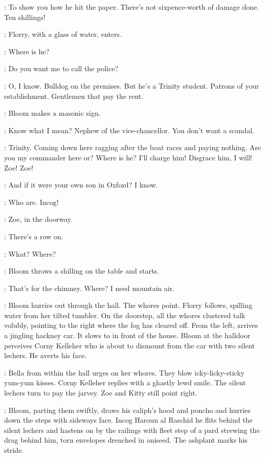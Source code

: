 \Bloom:
To show you how he hit the paper.
There's not sixpence-worth of damage done.
Ten shillings!

:
Florry, with a glass of water, enters.

\Florry:
Where is he?

\Bella:
Do you want me to call the police?

\Bloom:
O, I know.
Bulldog on the premises.
But he's a Trinity student.
Patrons of your establishment.
Gentlemen that pay the rent.

:
Bloom makes a masonic sign.

\Bloom:
Know what I mean?
Nephew of the vice-chancellor.
You don't want a scandal.%

\Bella:
Trinity.
Coming down here ragging after the boat races and paying nothing.
Are you my commander here or?
Where is he?
I'll charge him!
Disgrace him, I will!
Zoe! Zoe!

\Bloom:
And if it were your own son in Oxford?
I know.

\Bella:
Who are.
Incog!

:
Zoe, in the doorway.

\Zoe:
There's a row on.

\Bloom:
What? Where?

:
Bloom throws a shilling on the table and starts.

\Bloom:
That's for the chimney.
Where?
I need mountain air.

:
Bloom hurries out through the hall.
The whores point.
Florry follows, spilling water from her tilted tumbler.
On the doorstep, all the whores clustered talk volubly,
pointing to the right where the fog has cleared off.
From the left, arrives a jingling hackney car.
It slows to in front of the house.
Bloom at the halldoor perceives Corny Kelleher
who is about to dismount from the car with two silent lechers.
He averts his face.

:
Bella from within the hall urges on her whores.
They blow icky-licky-sticky yum-yum kisses.
Corny Kelleher replies with a ghastly lewd smile.
The silent lechers turn to pay the jarvey.
Zoe and Kitty still point right.

:
Bloom, parting them swiftly, draws his caliph's hood and poncho
and hurries down the steps with sideways face.
Incog Haroun al Raschid he flits behind the silent lechers
and hastens on by the railings with fleet step of a pard
strewing the drag behind him, torn envelopes drenched in aniseed.
The ashplant marks his stride.

